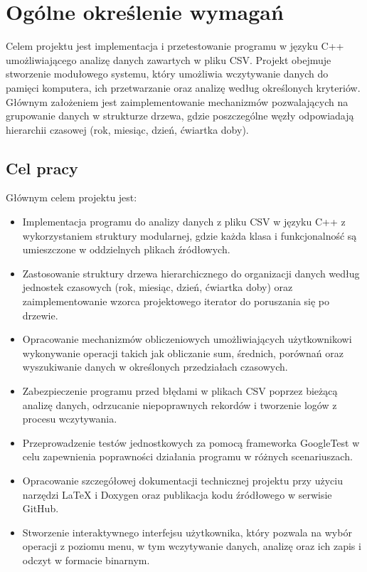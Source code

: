 \newpage
\section{Ogólne określenie wymagań}		%

Celem projektu jest implementacja i przetestowanie programu w języku C++ umożliwiającego analizę danych zawartych w pliku CSV. Projekt obejmuje stworzenie modułowego systemu, który umożliwia wczytywanie danych do pamięci komputera, ich przetwarzanie oraz analizę według określonych kryteriów. Głównym założeniem jest zaimplementowanie mechanizmów pozwalających na grupowanie danych w strukturze drzewa, gdzie poszczególne węzły odpowiadają hierarchii czasowej (rok, miesiąc, dzień, ćwiartka doby).
\subsection{Cel pracy}
Głównym celem projektu jest:
\begin{itemize}
    \item Implementacja programu do analizy danych z pliku CSV w języku C++ z wykorzystaniem struktury modularnej, gdzie każda klasa i funkcjonalność są umieszczone w oddzielnych plikach źródłowych.
    \item Zastosowanie struktury drzewa hierarchicznego do organizacji danych według jednostek czasowych (rok, miesiąc, dzień, ćwiartka doby) oraz zaimplementowanie wzorca projektowego iterator do poruszania się po drzewie.
    \item Opracowanie mechanizmów obliczeniowych umożliwiających użytkownikowi wykonywanie operacji takich jak obliczanie sum, średnich, porównań oraz wyszukiwanie danych w określonych przedziałach czasowych.
    \item Zabezpieczenie programu przed błędami w plikach CSV poprzez bieżącą analizę danych, odrzucanie niepoprawnych rekordów i tworzenie logów z procesu wczytywania.
    \item Przeprowadzenie testów jednostkowych za pomocą frameworka GoogleTest w celu zapewnienia poprawności działania programu w różnych scenariuszach.
    \item Opracowanie szczegółowej dokumentacji technicznej projektu przy użyciu narzędzi LaTeX i Doxygen oraz publikacja kodu źródłowego w serwisie GitHub.
    \item Stworzenie interaktywnego interfejsu użytkownika, który pozwala na wybór operacji z poziomu menu, w tym wczytywanie danych, analizę oraz ich zapis i odczyt w formacie binarnym.
\end{itemize}
\newpage
